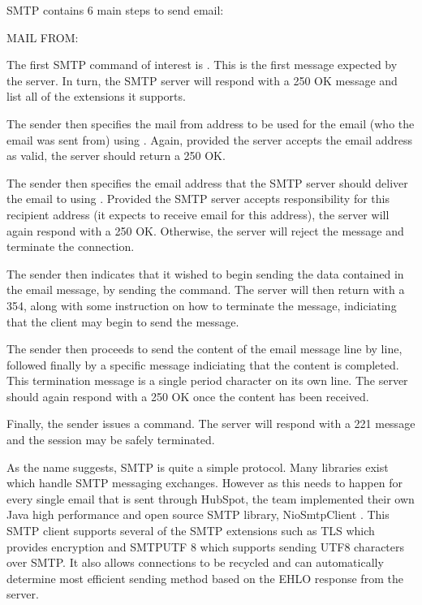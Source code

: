 SMTP contains 6 main steps to send email:
\begin{labeling}{MAIL FROM: }
  \item[EHLO] The first SMTP command of interest is . This is the first message expected by the server. In turn, the SMTP server will respond with a 250 OK message and list all of the extensions it supports. 
  \item[MAIL FROM:] The sender then specifies the mail from address to be used for the email (who the email was sent from) using . Again, provided the server accepts the email address as valid, the server should return a 250 OK.
  \item[RCPT TO:] The sender then specifies the email address that the SMTP server should deliver the email to using . Provided the SMTP server accepts responsibility for this recipient address (it expects to receive email for this address), the server will again respond with a 250 OK. Otherwise, the server will reject the message and terminate the connection.
  \item[DATA] The sender then indicates that it wished to begin sending the data contained in the email message, by sending the  command. The server will then return with a 354, along with some instruction on how to terminate the message, indiciating that the client may begin to send the message.
  \item[<content>] The sender then proceeds to send the content of the email message line by line, followed finally by a specific message indiciating that the content is completed. This termination message is a single period character on its own line. The server should again respond with a 250 OK once the content has been received.
  \item[QUIT] Finally, the sender issues a  command. The server will respond with a 221 message and the session may be safely terminated.
\end{labeling}

As the name suggests, SMTP is quite a simple protocol. Many libraries exist which handle SMTP messaging exchanges. However as this needs to happen for every single email that is sent through HubSpot, the \team{} team implemented their own Java high performance and open source SMTP library, NioSmtpClient \cite{hubspotSmtp}. This SMTP client supports several of the SMTP extensions such as TLS which provides encryption and SMTPUTF 8 which supports sending UTF8 characters over SMTP. It also allows connections to be recycled and can automatically determine most efficient sending method based on the EHLO response from the server.     

